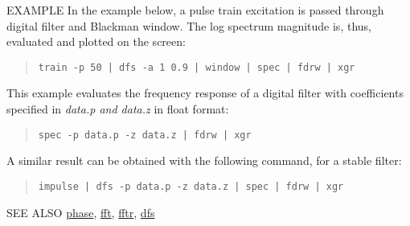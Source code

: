 \begin{qsection}{EXAMPLE}
In the example below, a pulse train excitation is passed
through digital filter and Blackman window.
The log spectrum magnitude is, thus, evaluated and plotted
on the screen:
\begin{quote}
  \verb!train -p 50 | dfs -a 1 0.9 | window | spec | fdrw | xgr !
\end{quote}
\par
This example evaluates the frequency response of
a digital filter with coefficients specified in {\em data.p and data.z}
in float format:
\begin{quote}
  \verb!spec -p data.p -z data.z | fdrw | xgr !
\end{quote}
A similar result can be obtained with the following command,
 for a stable filter:
\begin{quote}
  \verb!impulse | dfs -p data.p -z data.z | spec | fdrw | xgr !
\end{quote}
\end{qsection}

\begin{qsection}{SEE ALSO}
\hyperlink{phase}{phase},
\hyperlink{fft}{fft},
\hyperlink{fftr}{fftr},
\hyperlink{dfs}{dfs}
\end{qsection}
